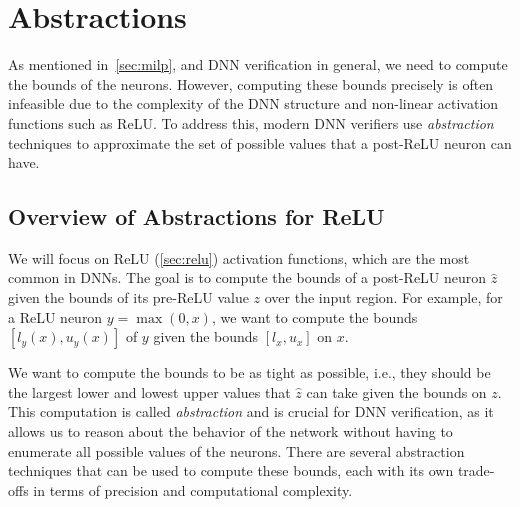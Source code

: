 \documentclass[oneside,11pt,dvipsnames]{book}
\numberwithin{equation}{section}
\theoremstyle{definition}
\theoremstyle{remark}
\begin{document}
\chapter{Abstractions}\label{chap:abstractions}


As mentioned in~\autoref{sec:milp}, and DNN verification in general, we need to compute the bounds of the neurons. However, computing these bounds precisely is often infeasible due to the complexity of the DNN structure and non-linear activation functions such as ReLU. To address this, modern DNN verifiers use \emph{abstraction} techniques to approximate the set of possible values that a post-ReLU neuron can have. 

\section{Overview of Abstractions for ReLU} 

We will focus on ReLU (\autoref{sec:relu}) activation functions, which are the most common in DNNs. The goal is to compute the bounds of a post-ReLU neuron $\hat{z}$ given the bounds of its pre-ReLU value $z$ over the input region. For example, for a ReLU neuron $y = \max(0, x)$, we want to compute the bounds $[l_y(x), u_y(x)]$ of $y$ given the bounds $[l_x, u_x]$ on $x$.

We want to compute the bounds to be as tight as possible, i.e., they should be the largest lower and lowest upper values that $\hat{z}$ can take given the bounds on $z$. This computation is called \emph{abstraction} and is crucial for DNN verification, as it allows us to reason about the behavior of the network without having to enumerate all possible values of the neurons. There are several abstraction techniques that can be used to compute these bounds, each with its own trade-offs in terms of precision and computational complexity.
\end{document}
